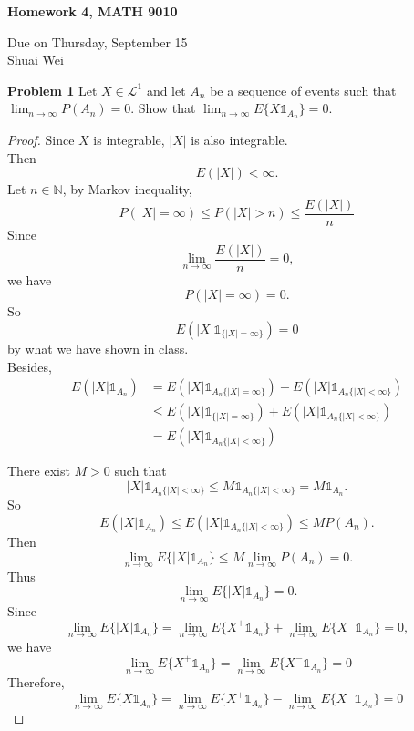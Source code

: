 \documentclass{article}
\newcommand{\idca}{\mathbb{1}}
\newcommand{\llll}{\mathcal{L}}
\newcommand{\bbn}{\mathbb{N}}
\begin{document}
\begin{center}

\textbf{Homework 4, MATH 9010}

Due on Thursday, September 15\\

Shuai Wei

\end{center}

\vspace{3 mm}

\noindent \textbf{Problem 1} Let $X\in \llll^1$ and let $A_n$ be a sequence of events such that $\lim_{n\to \infty}P(A_n) = 0$. Show that $\lim_{n\to \infty}E\{X\idca_{A_n}\}= 0$. \\

\begin{proof}
Since $X$ is integrable, $|X|$ is also integrable.\\ 
Then 
	\[E(|X|)  < \infty.\]
Let $n \in \bbn$, by Markov inequality, 	
\[P(|X|=\infty) \leq  P(|X|>n) \leq \frac{E(|X|)}{n} \]	
Since 
\[\lim_{n \to \infty}\frac{E(|X|)}{n} = 0,\]
we have 
\[P(|X|=\infty) = 0.\]
So 
\[E(|X|\idca_{\{|X| = \infty\}})= 0\]
by what we have shown in class.\\
Besides,
\begin{align*}
  E(|X|\idca_{A_n}) &= E(|X|\idca_{A_n\{|X| = \infty\}}) + E(|X|\idca_{A_n\{|X| < \infty\}}) \\
			    &\leq E(|X|\idca_{\{|X| = \infty\}}) + E(|X|\idca_{A_n\{|X| < \infty\}}) \\
  		        &=E(|X|\idca_{A_n\{|X| < \infty\}})
\end{align*}

There exist $M > 0$ such that
\[ |X|\idca_{A_n\{|X| < \infty\}} \leq M\idca_{A_n\{|X| < \infty\}} = M\idca_{A_n}. \]
So 
\[ E(|X|\idca_{A_n}) \leq E(|X|\idca_{A_n\{|X| < \infty\}}) \leq  M P(A_n). \]
Then
\[\lim_{n\to \infty}E\{|X|\idca_{A_n}\} \leq M \lim_{n\to \infty} P(A_n) = 0.\]
Thus 
\[\lim_{n\to \infty}E\{|X|\idca_{A_n}\} =0 .\]
Since 
\[\lim_{n\to \infty}E\{|X|\idca_{A_n}\} = \lim_{n\to \infty}E\{X^{+}\idca_{A_n}\} + \lim_{n\to \infty}E\{X^{-}\idca_{A_n}\}  = 0, \]
	we have 
	\[\lim_{n\to \infty}E\{X^{+}\idca_{A_n}\} = \lim_{n\to \infty}E\{X^{-}\idca_{A_n}\}  = 0\]
Therefore,
 \[\lim_{n\to \infty}E\{X\idca_{A_n}\} = \lim_{n\to \infty}E\{X^{+}\idca_{A_n}\} - \lim_{n\to \infty}E\{X^{-}\idca_{A_n}\}  = 0 \]

\end{proof}

\newpage
\end{document}
